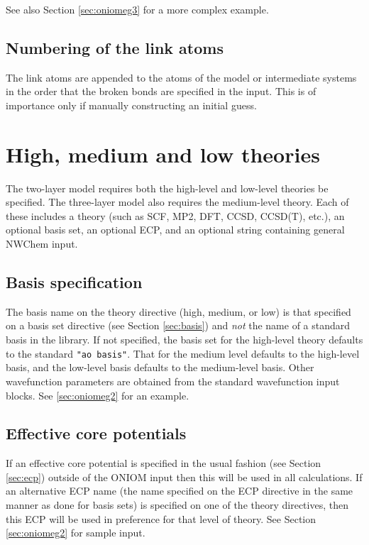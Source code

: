 See also Section \ref{sec:oniomeg3} for a more complex example.

\subsection{Numbering of the link atoms}

The link atoms are appended to the atoms of the model or intermediate
systems in the order that the broken bonds are specified in the input.
This is of importance only if manually constructing an initial guess.

\section{High, medium and low theories}

The two-layer model requires both the high-level and low-level
theories be specified.  The three-layer model also requires the
medium-level theory.  Each of these includes a theory (such as SCF,
MP2, DFT, CCSD, CCSD(T), etc.), an optional basis set, an optional ECP,
and an optional string containing general NWChem input.

\subsection{Basis specification}
The basis name on the theory directive (high, medium, or low) is that
specified on a basis set directive (see Section \ref{sec:basis}) and
{\em not} the name of a standard basis in the library.  If not
specified, the basis set for the high-level theory defaults to the
standard \verb+"ao basis"+.  That for the medium level defaults to the
high-level basis, and the low-level basis defaults to the medium-level
basis.  Other wavefunction parameters are obtained from the standard
wavefunction input blocks.  See \ref{sec:oniomeg2} for an example.

\subsection{Effective core potentials}

If an effective core potential is specified in the usual fashion (see
Section \ref{sec:ecp}) outside of the ONIOM input then this will be
used in all calculations.  If an alternative ECP name (the name
specified on the ECP directive in the same manner as done for basis
sets) is specified on one of the theory directives, then this ECP will
be used in preference for that level of theory.  See Section
\ref{sec:oniomeg2} for sample input.

